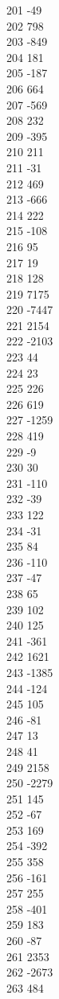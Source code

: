 { 201	-49 \\
 202	798 \\
 203	-849 \\
 204	181 \\
 205	-187 \\
 206	664 \\
 207	-569 \\
 208	232 \\
 209	-395 \\
 210	211 \\
 211	-31 \\
 212	469 \\
 213	-666 \\
 214	222 \\
 215	-108 \\
 216	95 \\
 217	19 \\
 218	128 \\
 219	7175 \\
 220	-7447 \\
 221	2154 \\
 222	-2103 \\
 223	44 \\
 224	23 \\
 225	226 \\
 226	619 \\
 227	-1259 \\
 228	419 \\
 229	-9 \\
 230	30 \\
 231	-110 \\
 232	-39 \\
 233	122 \\
 234	-31 \\
 235	84 \\
 236	-110 \\
 237	-47 \\
 238	65 \\
 239	102 \\
 240	125 \\
 241	-361 \\
 242	1621 \\
 243	-1385 \\
 244	-124 \\
 245	105 \\
 246	-81 \\
 247	13 \\
 248	41 \\
 249	2158 \\
 250	-2279 \\
 251	145 \\
 252	-67 \\
 253	169 \\
 254	-392 \\
 255	358 \\
 256	-161 \\
 257	255 \\
 258	-401 \\
 259	183 \\
 260	-87 \\
 261	2353 \\
 262	-2673 \\
 263	484 \\
}
